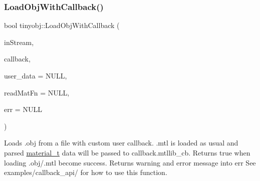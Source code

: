 \subsubsection{\texorpdfstring{Load\+Obj\+With\+Callback()}{LoadObjWithCallback()}}
{\footnotesize\ttfamily bool tinyobj\+::\+Load\+Obj\+With\+Callback (\begin{DoxyParamCaption}\item[{std\+::istream \&}]{in\+Stream,  }\item[{const \hyperlink{namespacetinyobj_a7d9ae2b4716367a1b66b4d354482b035}{callback\+\_\+t} \&}]{callback,  }\item[{void $\ast$}]{user\+\_\+data = {\ttfamily NULL},  }\item[{\hyperlink{classtinyobj_1_1MaterialReader}{Material\+Reader} $\ast$}]{read\+Mat\+Fn = {\ttfamily NULL},  }\item[{std\+::string $\ast$}]{err = {\ttfamily NULL} }\end{DoxyParamCaption})}

Loads .obj from a file with custom user callback. .mtl is loaded as usual and parsed \hyperlink{structtinyobj_1_1material__t}{material\+\_\+t} data will be passed to {\ttfamily callback.\+mtllib\+\_\+cb}. Returns true when loading .obj/.mtl become success. Returns warning and error message into {\ttfamily err} See {\ttfamily examples/callback\+\_\+api/} for how to use this function. 